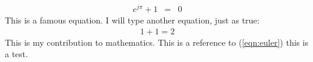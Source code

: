 \documentclass{article}
\begin{document}
\begin{eqnarray}
  \label{eqn:euler}
  e^{j\pi} + 1 &=& 0
\end{eqnarray}
This is a famous equation. I will type another equation, just as true:
\begin{eqnarray}
  1 + 1 = 2
  \label{eqn:simple}
\end{eqnarray}
This is my contribution to mathematics.
This is a reference to (\ref{eqn:euler})
this is a test.
\end{document}
